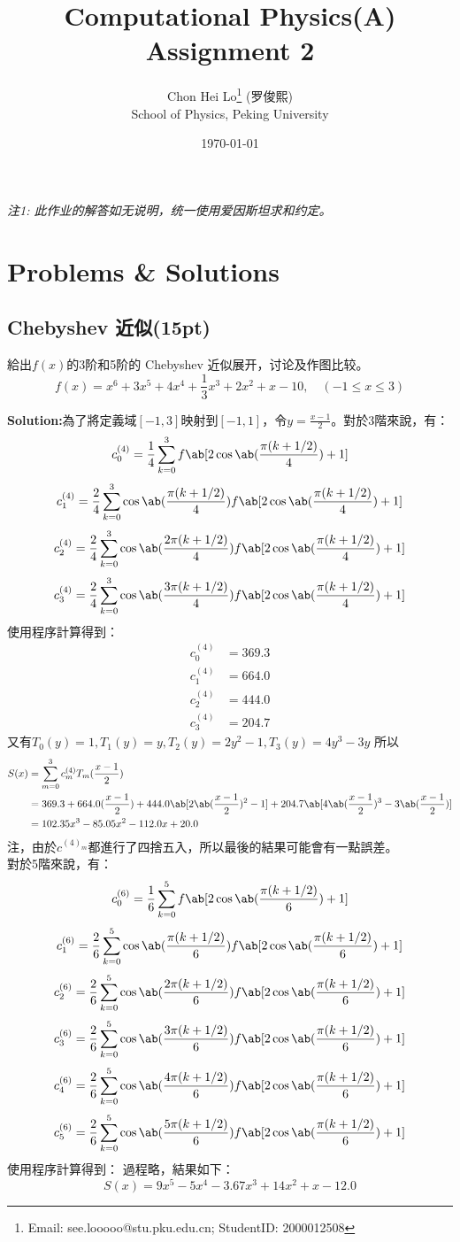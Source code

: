 \documentclass[12pt, a4paper, oneside]{article}
\title{\textbf{Computational Physics(A) \\Assignment 2}}
\author{Chon Hei Lo\thanks{Email: see.looooo@stu.pku.edu.cn; StudentID: 2000012508} (罗俊熙) \\ School of Physics, Peking University}
\date{\today}
\begin{document}
\maketitle

\begin{center}
\textit{注1: 此作业的解答如无说明，统一使用爱因斯坦求和约定。}
\end{center}
\section{Problems \& Solutions}
\subsection{Chebyshev 近似(15pt)}
給出$f(x)$的3阶和5阶的 Chebyshev 近似展开，讨论及作图比较。
$$f(x)=x^6+3x^5+4x^4+\frac13x^3+2x^2+x-10,\quad (-1\le x\le 3)$$


\textbf{Solution:}為了將定義域$[-1,3]$映射到$[-1,1]$，令$y=\frac{x-1}{2}$。對於3階來說，有：
$$c^{(4)}_0=\frac{1}{4}\sum_{k=0}^{3}f\ab[2\cos\ab(\frac{\pi(k+1/2)}{4})+1]$$
$$c^{(4)}_1=\frac{2}{4}\sum_{k=0}^{3}\cos\ab(\frac{\pi (k+1/2)}{4})f\ab[2\cos\ab(\frac{\pi(k+1/2)}{4})+1]$$
$$c^{(4)}_2=\frac{2}{4}\sum_{k=0}^{3}\cos\ab(\frac{2\pi (k+1/2)}{4})f\ab[2\cos\ab(\frac{\pi(k+1/2)}{4})+1]$$
$$c^{(4)}_3=\frac{2}{4}\sum_{k=0}^{3}\cos\ab(\frac{3\pi (k+1/2)}{4})f\ab[2\cos\ab(\frac{\pi(k+1/2)}{4})+1]$$
使用程序計算得到：
\begin{align*}
    c^{(4)}_0&=369.3\\
    c^{(4)}_1&=664.0\\
    c^{(4)}_2&=444.0\\
    c^{(4)}_3&= 204.7
\end{align*}
又有$T_0(y) = 1, T_1(y)= y, T_2(y) = 2y^2 - 1, T_3(y) = 4y^3 - 3y$
所以
\begin{align*}
    S(x) &= \sum_{m=0}^3c^{(4)}_mT_m(\frac{x-1}{2}) \\ 
         &= 369.3 + 664.0(\frac{x-1}{2}) + 444.0\ab[2\ab(\frac{x-1}{2})^2-1] + 204.7\ab[4\ab(\frac{x-1}{2})^3-3\ab(\frac{x-1}{2})] \\
         &= 102.35x^3 - 85.05x^2 - 112.0x + 20.0
\end{align*}
注，由於$c^{(4)_m}$都進行了四捨五入，所以最後的結果可能會有一點誤差。\\
對於5階來說，有：
$$c^{(6)}_0=\frac{1}{6}\sum_{k=0}^{5}f\ab[2\cos\ab(\frac{\pi(k+1/2)}{6})+1]$$
$$c^{(6)}_1=\frac{2}{6}\sum_{k=0}^{5}\cos\ab(\frac{\pi (k+1/2)}{6})f\ab[2\cos\ab(\frac{\pi(k+1/2)}{6})+1]$$
$$c^{(6)}_2=\frac{2}{6}\sum_{k=0}^{5}\cos\ab(\frac{2\pi (k+1/2)}{6})f\ab[2\cos\ab(\frac{\pi(k+1/2)}{6})+1]$$
$$c^{(6)}_3=\frac{2}{6}\sum_{k=0}^{5}\cos\ab(\frac{3\pi (k+1/2)}{6})f\ab[2\cos\ab(\frac{\pi(k+1/2)}{6})+1]$$
$$c^{(6)}_4=\frac{2}{6}\sum_{k=0}^{5}\cos\ab(\frac{4\pi (k+1/2)}{6})f\ab[2\cos\ab(\frac{\pi(k+1/2)}{6})+1]$$
$$c^{(6)}_5=\frac{2}{6}\sum_{k=0}^{5}\cos\ab(\frac{5\pi (k+1/2)}{6})f\ab[2\cos\ab(\frac{\pi(k+1/2)}{6})+1]$$
使用程序計算得到：
過程略，結果如下：
$$S(x) = 9 x^5 - 5 x^4 - 3.67 x^3 + 14 x^2 + x - 12.0$$
\clearpage
\end{document}
